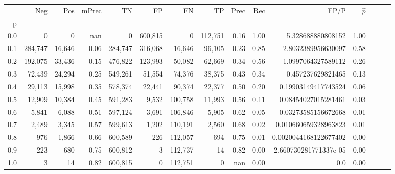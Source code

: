 \begin{tabular}{rrrrrrrrrrrrrrr}
\toprule
{} &      Neg &     Pos & mPrec &       TN &       FP &       FN &       TP &  Prec &   Rec &                   FP/P & $\hat{p}$ \\
p   &          &         &       &          &          &          &          &       &       &                        &           \\
\midrule
0.0 &        0 &       0 &   nan &        0 &  600,815 &        0 &  112,751 &  0.16 &  1.00 &      5.328688880808152 &      1.00 \\
0.1 &  284,747 &  16,646 &  0.06 &  284,747 &  316,068 &   16,646 &   96,105 &  0.23 &  0.85 &     2.8032389956630097 &      0.58 \\
0.2 &  192,075 &  33,436 &  0.15 &  476,822 &  123,993 &   50,082 &   62,669 &  0.34 &  0.56 &     1.0997064327589112 &      0.26 \\
0.3 &   72,439 &  24,294 &  0.25 &  549,261 &   51,554 &   74,376 &   38,375 &  0.43 &  0.34 &      0.457237629821465 &      0.13 \\
0.4 &   29,113 &  15,998 &  0.35 &  578,374 &   22,441 &   90,374 &   22,377 &  0.50 &  0.20 &    0.19903149417743524 &      0.06 \\
0.5 &   12,909 &  10,384 &  0.45 &  591,283 &    9,532 &  100,758 &   11,993 &  0.56 &  0.11 &    0.08454027015281461 &      0.03 \\
0.6 &    5,841 &   6,088 &  0.51 &  597,124 &    3,691 &  106,846 &    5,905 &  0.62 &  0.05 &    0.03273585156672668 &      0.01 \\
0.7 &    2,489 &   3,345 &  0.57 &  599,613 &    1,202 &  110,191 &    2,560 &  0.68 &  0.02 &   0.010660659328963823 &      0.01 \\
0.8 &      976 &   1,866 &  0.66 &  600,589 &      226 &  112,057 &      694 &  0.75 &  0.01 &  0.0020044168122677402 &      0.00 \\
0.9 &      223 &     680 &  0.75 &  600,812 &        3 &  112,737 &       14 &  0.82 &  0.00 &  2.660730281771337e-05 &      0.00 \\
1.0 &        3 &      14 &  0.82 &  600,815 &        0 &  112,751 &        0 &   nan &  0.00 &                    0.0 &      0.00 \\
\bottomrule
\end{tabular}
